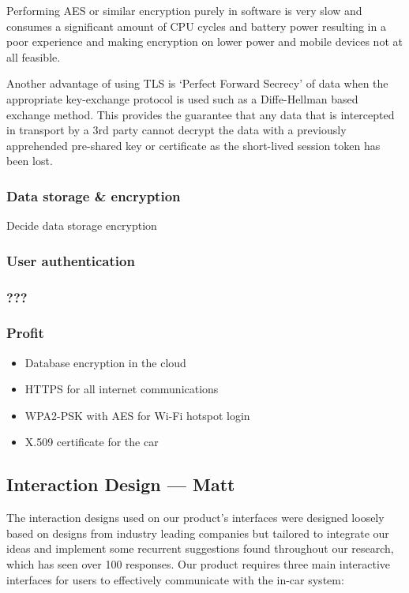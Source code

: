 \documentclass{article}
\begin{document}
Performing AES or similar encryption purely in software is very slow and consumes a significant amount of CPU cycles and battery power resulting in a poor experience and making encryption on lower power and mobile devices not at all feasible.

Another advantage of using TLS is `Perfect Forward Secrecy' of data when the appropriate key-exchange protocol is used such as a Diffe-Hellman based exchange method. This provides the guarantee that any data that is intercepted in transport by a 3rd party cannot decrypt the data with a previously apprehended pre-shared key or certificate as the short-lived session token has been lost.

\subsubsection{Data storage \& encryption}
{\Large\color{red} Decide data storage encryption}

\subsubsection{User authentication}


\subsubsection{???}
\subsubsection{Profit}



\begin{itemize}
  \item Database encryption in the cloud
  \item HTTPS for all internet communications
  \item WPA2-PSK with AES for Wi-Fi hotspot login
  \item X.509 certificate for the car
\end{itemize}

\subsection{Interaction Design --- Matt}\label{ssec:interaction-design}
The interaction designs used on our product's interfaces were designed loosely based on designs from industry leading companies but tailored to integrate our ideas and implement some recurrent suggestions found throughout our research, which has seen over 100 responses. Our product requires three main interactive interfaces for users to effectively communicate with the in-car system:
\end{document}
